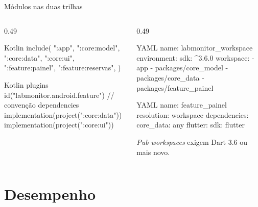 \documentclass[aspectratio=169,10pt]{beamer}
\begin{document}
\begin{frame}[fragile]{Módulos nas duas trilhas}
  \begin{columns}[T]
    \begin{column}{0.49\textwidth}
\begin{codigo}[title=Kotlin: settings.gradle.kts]{Kotlin}
include(
  ":app",
  ":core:model", ":core:data", ":core:ui",
  ":feature:painel", ":feature:reservas",
)
\end{codigo}
\begin{codigo}[title=feature/painel/build.gradle.kts]{Kotlin}
plugins {
  id("labmonitor.android.feature")  // convenção
}
dependencies {
  implementation(project(":core:data"))
  implementation(project(":core:ui"))
}
\end{codigo}
    \end{column}
    \begin{column}{0.49\textwidth}
\begin{codigo}[title=Flutter: pubspec.yaml da raiz]{YAML}
name: labmonitor_workspace
environment:
  sdk: ^3.6.0
workspace:
  - app
  - packages/core_model
  - packages/core_data
  - packages/feature_painel
\end{codigo}
\begin{codigo}[title=packages/feature\_painel/pubspec.yaml]{YAML}
name: feature_painel
resolution: workspace
dependencies:
  core_data: any
  flutter: { sdk: flutter }
\end{codigo}
      \begin{dica}
        \emph{Pub workspaces} exigem Dart 3.6 ou mais novo.
      \end{dica}
    \end{column}
  \end{columns}
\end{frame}

\section{Desempenho}
\end{document}
